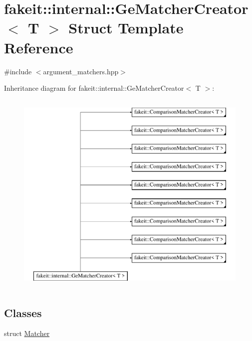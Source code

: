 \hypertarget{structfakeit_1_1internal_1_1GeMatcherCreator}{}\section{fakeit\+::internal\+::Ge\+Matcher\+Creator$<$ T $>$ Struct Template Reference}
\label{structfakeit_1_1internal_1_1GeMatcherCreator}


{\ttfamily \#include $<$argument\+\_\+matchers.\+hpp$>$}

Inheritance diagram for fakeit\+::internal\+::Ge\+Matcher\+Creator$<$ T $>$\+:\begin{figure}[H]
\begin{center}
\leavevmode
\includegraphics[height=10.000000cm]{structfakeit_1_1internal_1_1GeMatcherCreator}
\end{center}
\end{figure}
\subsection*{Classes}
\begin{DoxyCompactItemize}
\item 
struct \mbox{\hyperlink{structfakeit_1_1internal_1_1GeMatcherCreator_1_1Matcher}{Matcher}}
\end{DoxyCompactItemize}
